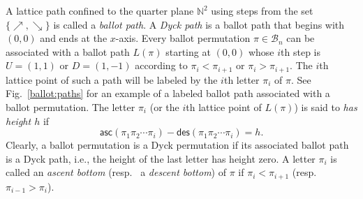 \documentclass[12pt]{amsart}
\numberwithin{equation}{section}
\theoremstyle{plain}
\theoremstyle{definition}
\newcommand{\N}{\mathbb{N}}
\newcommand{\B}{\mathcal{B}}
\def\des{\mathsf{des}}
\def\asc{\mathsf{asc}}
\begin{document}
A lattice path confined to the quarter plane $\N^2$ using steps from the set $\{\nearrow,\searrow\}$ is called a {\em ballot path}. A {\em Dyck path} is a ballot path that begins with $(0,0)$ and ends at the $x$-axis. Every ballot permutation $\pi\in\B_n$ can be associated with a ballot path $L(\pi)$ starting at $(0,0)$ whose $i$th step is  $U=(1,1)$ or $D=(1,-1)$ according to 
$\pi_i<\pi_{i+1}$ or $\pi_i>\pi_{i+1}$. The $i$th lattice point of such a path will be labeled by the $i$th letter $\pi_i$ of $\pi$. See Fig.~\ref{ballot:paths} for an example of a labeled ballot path associated with a ballot permutation.  The letter $\pi_i$ (or the $i$th lattice point of $L(\pi)$) is said to {\em has height $h$} if
$$
\asc(\pi_1\pi_2\cdots\pi_i)-\des(\pi_1\pi_2\cdots\pi_i)=h.
$$
Clearly, a ballot permutation is a Dyck permutation if its associated ballot path is a Dyck path, i.e., the height of the last letter has height zero. A letter $\pi_i$ is called an {\em ascent bottom} (resp.~ a {\em descent bottom}) of $\pi$ if $\pi_i<\pi_{i+1}$ (resp.~$\pi_{i-1}>\pi_i$). 
\end{document}
